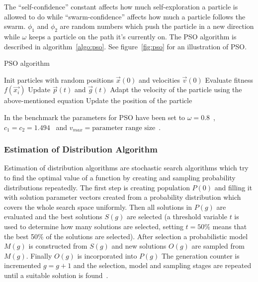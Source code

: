 The “self-confidence” constant affects how much self-exploration a particle is allowed to do while “swarm-confidence” affects how much a particle follows the swarm. $\phi_1$ and $\phi_2$ are random numbers which push the particle in a new direction while $\omega$ keeps a particle on the path it’s currently on. The PSO algorithm is described in algorithm~\ref{algo:pso}. See figure~\ref{fig:pso} for an illustration of PSO.

\begin{algorithm}[h]
  \caption{PSO algorithm}
  \label{algo:pso}
    \begin{algorithmic}
      \State Init particles with random positions
      $\vec{x}(0)$ and velocities $\vec{v}(0)$
      \Repeat
          \State Evaluate fitness $f(\vec{x_i})$
          \State Update $\vec{p}(t)$ and $\vec{g}(t)$
          \State Adapt the velocity of the particle using the above-mentioned equation
          \State Update the position of the particle
        \EndFor
    \end{algorithmic}
\end{algorithm}



In the benchmark the parameters for PSO have been set to $\omega = 0.8$~\cite{shi1998modified}, $c_1 = c_2 = 1.494$~\cite{kennedy1999small} and $v_{max} = \text{parameter range size}$~\cite{Das2008}.

\subsubsection{Estimation of Distribution Algorithm}

Estimation of distribution algorithms are stochastic search algorithms which try to find the optimal value of a function by creating and sampling probability distributions repeatedly. The first step is creating population $P(0)$ and filling it with solution parameter vectors created from a probability distribution which covers the whole search space uniformly. Then all solutions in $P(g)$ are evaluated and the best solutions $S(g)$ are selected (a threshold variable $t$ is used to determine how many solutions are selected, setting $t=50\%$ means that the best 50\% of the solutions are selected). After selection a probabilistic model $M(g)$ is constructed from $S(g)$ and new solutions $O(g)$ are sampled from $M(g)$. Finally $O(g)$ is incorporated into $P(g)$ The generation counter is incremented $g = g + 1$ and the selection, model and sampling stages are repeated until a suitable solution is found~\cite{Hauschild2011111}.

